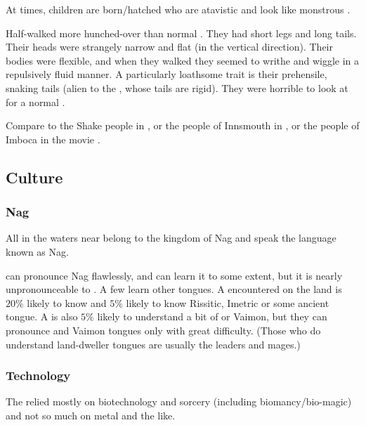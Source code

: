 At times, children are born/hatched who are atavistic and look like monstrous \nagae. 

Half-\nagae walked more hunched-over than normal \scathae.
They had short legs and long tails. 
Their heads were strangely narrow and flat (in the vertical direction). 
Their bodies were flexible, and when they walked they seemed to writhe and wiggle in a repulsively fluid manner.
A particularly loathsome trait is their prehensile, snaking tails (alien to the \scathae, whose tails are rigid).
They were horrible to look at for a normal \scatha.

Compare to the Shake people in \cite[pp.360--361]{StevenErikson:ReapersGale}, or the people of Innsmouth in , or the people of Imboca in the movie . 









\subsection{Culture}






\subsubsection{Nag}
All \nagae{} in the waters near \Azmith{} belong to the kingdom of Nag and speak the language known as Nag. 

\Dragons{} can pronounce Nag flawlessly, and \scathae{} can learn it to some extent, but it is nearly unpronounceable to \humans{}. 
A few \nagae{} learn other tongues. 
A \naga{} encountered on the land is $20\%$ likely to know \CommonDraconic and $5\%$ likely to know Rissitic, Imetric or some ancient \scathaese{} tongue. 
A \naga{} is also $5\%$ likely to understand a bit of \Velcadian{} or Vaimon, but they can pronounce \human{} and Vaimon tongues only with great difficulty. 
(Those \nagae{} who do understand land-dweller tongues are usually the leaders and mages.) 






\subsubsection{Technology}
The \nagae relied mostly on biotechnology and sorcery (including biomancy/bio-magic) and not so much on metal and the like. 

